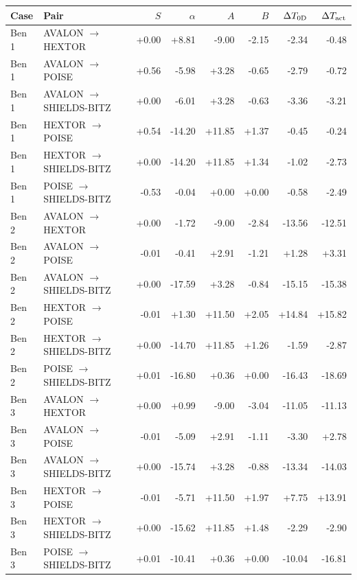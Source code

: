 \small
\begin{tabular}{llrrrrrr}
\toprule
Case & Pair & $S$ & $\alpha$ & $A$ & $B$ & $\Delta T_{\rm 0D}$ & $\Delta T_{\rm act}$ \\
\midrule
Ben 1 & AVALON $\rightarrow$ HEXTOR & +0.00 & +8.81 & -9.00 & -2.15 & -2.34 & -0.48 \\
Ben 1 & AVALON $\rightarrow$ POISE & +0.56 & -5.98 & +3.28 & -0.65 & -2.79 & -0.72 \\
Ben 1 & AVALON $\rightarrow$ SHIELDS-BITZ & +0.00 & -6.01 & +3.28 & -0.63 & -3.36 & -3.21 \\
Ben 1 & HEXTOR $\rightarrow$ POISE & +0.54 & -14.20 & +11.85 & +1.37 & -0.45 & -0.24 \\
Ben 1 & HEXTOR $\rightarrow$ SHIELDS-BITZ & +0.00 & -14.20 & +11.85 & +1.34 & -1.02 & -2.73 \\
Ben 1 & POISE $\rightarrow$ SHIELDS-BITZ & -0.53 & -0.04 & +0.00 & +0.00 & -0.58 & -2.49 \\
\addlinespace
Ben 2 & AVALON $\rightarrow$ HEXTOR & +0.00 & -1.72 & -9.00 & -2.84 & -13.56 & -12.51 \\
Ben 2 & AVALON $\rightarrow$ POISE & -0.01 & -0.41 & +2.91 & -1.21 & +1.28 & +3.31 \\
Ben 2 & AVALON $\rightarrow$ SHIELDS-BITZ & +0.00 & -17.59 & +3.28 & -0.84 & -15.15 & -15.38 \\
Ben 2 & HEXTOR $\rightarrow$ POISE & -0.01 & +1.30 & +11.50 & +2.05 & +14.84 & +15.82 \\
Ben 2 & HEXTOR $\rightarrow$ SHIELDS-BITZ & +0.00 & -14.70 & +11.85 & +1.26 & -1.59 & -2.87 \\
Ben 2 & POISE $\rightarrow$ SHIELDS-BITZ & +0.01 & -16.80 & +0.36 & +0.00 & -16.43 & -18.69 \\
\addlinespace
Ben 3 & AVALON $\rightarrow$ HEXTOR & +0.00 & +0.99 & -9.00 & -3.04 & -11.05 & -11.13 \\
Ben 3 & AVALON $\rightarrow$ POISE & -0.01 & -5.09 & +2.91 & -1.11 & -3.30 & +2.78 \\
Ben 3 & AVALON $\rightarrow$ SHIELDS-BITZ & +0.00 & -15.74 & +3.28 & -0.88 & -13.34 & -14.03 \\
Ben 3 & HEXTOR $\rightarrow$ POISE & -0.01 & -5.71 & +11.50 & +1.97 & +7.75 & +13.91 \\
Ben 3 & HEXTOR $\rightarrow$ SHIELDS-BITZ & +0.00 & -15.62 & +11.85 & +1.48 & -2.29 & -2.90 \\
Ben 3 & POISE $\rightarrow$ SHIELDS-BITZ & +0.01 & -10.41 & +0.36 & +0.00 & -10.04 & -16.81 \\
\bottomrule
\end{tabular}
